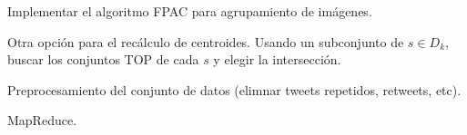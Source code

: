\begin{frame}

\item Implementar el algoritmo FPAC para agrupamiento de imágenes.
\item Otra opción para el recálculo de centroides. Usando un
subconjunto de $s \in D_k$, buscar los conjuntos TOP
de cada $s$ y elegir la intersección.
\item Preprocesamiento del conjunto de datos (elimnar tweets repetidos, retweets, etc).
\item MapReduce. 
\end{frame}
